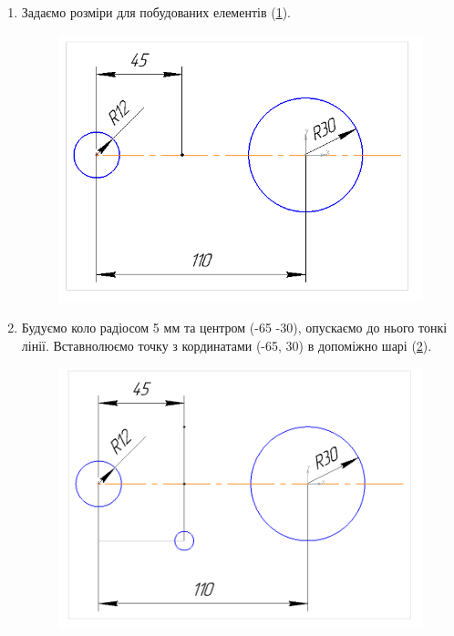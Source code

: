 \begin{enumerate}[leftmargin=*]
\item Задаємо розміри для побудованих елементів (\ref{fig:lab4:step2}).
  \begin{figure}[!ht]
    \centering \includegraphics[width=0.9\linewidth]{./images/lab4/step2.png}
    \caption{\label{fig:lab4:step2}}
  \end{figure}
  \FloatBarrier

\item Будуємо коло радіосом 5 мм та центром (-65 -30), опускаємо до нього тонкі лінії. Вставнолюємо
  точку з кординатами (-65, 30) в допоміжно шарі (\ref{fig:lab4:step3}).
  \begin{figure}[!ht]
    \centering \includegraphics[width=0.7\linewidth]{./images/lab4/step3.png}
    \caption{\label{fig:lab4:step3}}
  \end{figure}
  \FloatBarrier


\end{enumerate}
